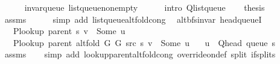 \begin{isabellebody}
\ \ \ \ \isamarkupfalse%
\ invar{\isacharunderscore}{\kern0pt}queue\ list{\isacharunderscore}{\kern0pt}queue{\isacharunderscore}{\kern0pt}non{\isacharunderscore}{\kern0pt}empty\isanewline
\ \ \ \ \isamarkupfalse%
\ {\isacharparenleft}{\kern0pt}intro\ Q{\isachardot}{\kern0pt}list{\isacharunderscore}{\kern0pt}queue{\isacharparenright}{\kern0pt}\isanewline
\ \ \isamarkupfalse%
\ {\isacharquery}{\kern0pt}thesis\isanewline
\ \ \ \ \isamarkupfalse%
\ assms\isanewline
\ \ \ \ \isamarkupfalse%
\ {\isacharparenleft}{\kern0pt}simp\ add{\isacharcolon}{\kern0pt}\ list{\isacharunderscore}{\kern0pt}queue{\isacharunderscore}{\kern0pt}alt{\isacharunderscore}{\kern0pt}fold{\isacharunderscore}{\kern0pt}cong{\isacharparenright}{\kern0pt}\isanewline
{}\isamarkupfalse%
%
\endisatagproof
{\isafoldproof}%
%
\isadelimproof
\isanewline
%
\endisadelimproof
\isanewline
{}\isamarkupfalse%
\ {\isacharparenleft}{\kern0pt}\ alt{\isacharunderscore}{\kern0pt}bfs{\isacharunderscore}{\kern0pt}invar{\isacharparenright}{\kern0pt}\ head{\isacharunderscore}{\kern0pt}queueI{\isacharunderscore}{\kern0pt}{}{\isacharcolon}{\kern0pt}\isanewline
\ \ \ {\isachardoublequoteopen}P{\isacharunderscore}{\kern0pt}lookup\ {\isacharparenleft}{\kern0pt}parent\ s{\isacharparenright}{\kern0pt}\ v\ {\isasymnoteq}\ Some\ u{\isachardoublequoteclose}\isanewline
\ \ \ {\isachardoublequoteopen}P{\isacharunderscore}{\kern0pt}lookup\ {\isacharparenleft}{\kern0pt}parent\ {\isacharparenleft}{\kern0pt}alt{\isacharunderscore}{\kern0pt}fold\ G{}\ G{}\ src\ s{\isacharparenright}{\kern0pt}{\isacharparenright}{\kern0pt}\ v\ {\isacharequal}{\kern0pt}\ Some\ u{\isachardoublequoteclose}\isanewline
\ \ \ {\isachardoublequoteopen}u\ {\isacharequal}{\kern0pt}\ Q{\isacharunderscore}{\kern0pt}head\ {\isacharparenleft}{\kern0pt}queue\ s{\isacharparenright}{\kern0pt}{\isachardoublequoteclose}\isanewline
%
\isadelimproof
\ \ %
\endisadelimproof
%
\isatagproof
{}\isamarkupfalse%
\ assms\isanewline
\ \ \isamarkupfalse%
\ {\isacharparenleft}{\kern0pt}simp\ add{\isacharcolon}{\kern0pt}\ lookup{\isacharunderscore}{\kern0pt}parent{\isacharunderscore}{\kern0pt}alt{\isacharunderscore}{\kern0pt}fold{\isacharunderscore}{\kern0pt}cong\ override{\isacharunderscore}{\kern0pt}on{\isacharunderscore}{\kern0pt}def\ split{\isacharcolon}{\kern0pt}\ if{\isacharunderscore}{\kern0pt}splits{\isacharparenleft}{\kern0pt}{}{\isacharparenright}{\kern0pt}{\isacharparenright}{\kern0pt}%

\end{isabellebody}
